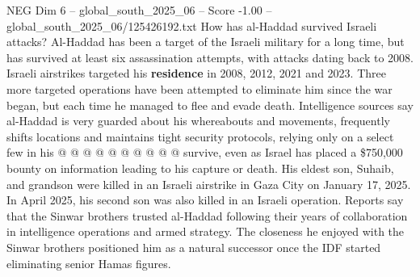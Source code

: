 \begin{textsample}{NEG Dim 6 – global\_south\_2025\_06 – Score -1.00 – global\_south\_2025\_06/125426192.txt}
How has al-Haddad survived Israeli attacks?
Al-Haddad has been a target of the Israeli military for a long time, but has survived at least six assassination attempts, with attacks dating back to 2008.
Israeli airstrikes targeted his \textbf{residence} in 2008, 2012, 2021 and 2023.
Three more targeted operations have been attempted to eliminate him since the war began, but each time he managed to flee and evade death.
Intelligence sources say al-Haddad is very guarded about his whereabouts and movements, frequently shifts locations and maintains tight security protocols, relying only on a select few in his @ @ @ @ @ @ @ @ @ @ survive, even as Israel has placed a \$750,000 bounty on information leading to his capture or death.
His eldest son, Suhaib, and grandson were killed in an Israeli airstrike in Gaza City on January 17, 2025.
In April 2025, his second son was also killed in an Israeli operation.
Reports say that the Sinwar brothers trusted al-Haddad following their years of collaboration in intelligence operations and armed strategy.
The closeness he enjoyed with the Sinwar brothers positioned him as a natural successor once the IDF started eliminating senior Hamas figures.

\end{textsample}
